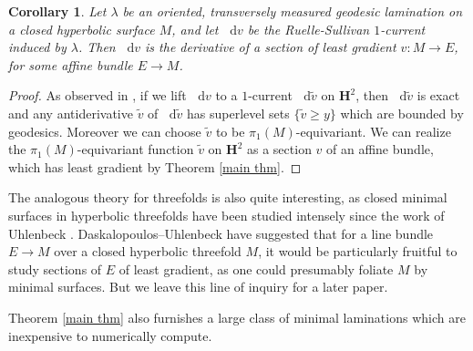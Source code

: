 \documentclass[reqno,10pt]{amsart}
\newcommand{\Hyp}{\mathbf H}
\newcommand*\dif{\mathop{}\!\mathrm{d}}
\newtheorem{corollary}[theorem]{Corollary}
\theoremstyle{definition}
\numberwithin{equation}{section}
\begin{document}
\begin{corollary}\label{ruelle sullivan antiderivative}
Let $\lambda$ be an oriented, transversely measured geodesic lamination on a closed hyperbolic surface $M$, and let $\dif v$ be the Ruelle-Sullivan $1$-current induced by $\lambda$.
Then $\dif v$ is the derivative of a section of least gradient $v: M \to E$, for some affine bundle $E \to M$.
\end{corollary}
\begin{proof}
As observed in \cite[\S9]{daskalopoulos2020transverse}, if we lift $\dif v$ to a $1$-current $\dif \tilde v$ on $\Hyp^2$, then $\dif \tilde v$ is exact and any antiderivative $\tilde v$ of $\dif \tilde v$ has superlevel sets $\{\tilde v \geq y\}$ which are bounded by geodesics.
Moreover we can choose $\tilde v$ to be $\pi_1(M)$-equivariant.
We can realize the $\pi_1(M)$-equivariant function $\tilde v$ on $\Hyp^2$ as a section $v$ of an affine bundle, which has least gradient by Theorem \ref{main thm}.
\end{proof}

The analogous theory for threefolds is also quite interesting, as closed minimal surfaces in hyperbolic threefolds have been studied intensely since the work of Uhlenbeck \cite{Uhlenbeck1983ClosedMS}.
Daskalopoulos--Uhlenbeck have suggested \cite[Problem 9.13]{daskalopoulos2020transverse} that for a line bundle $E \to M$ over a closed hyperbolic threefold $M$, it would be particularly fruitful to study sections of $E$ of least gradient, as one could presumably foliate $M$ by minimal surfaces.
But we leave this line of inquiry for a later paper.

Theorem \ref{main thm} also furnishes a large class of minimal laminations which are inexpensive to numerically compute.
\end{document}
